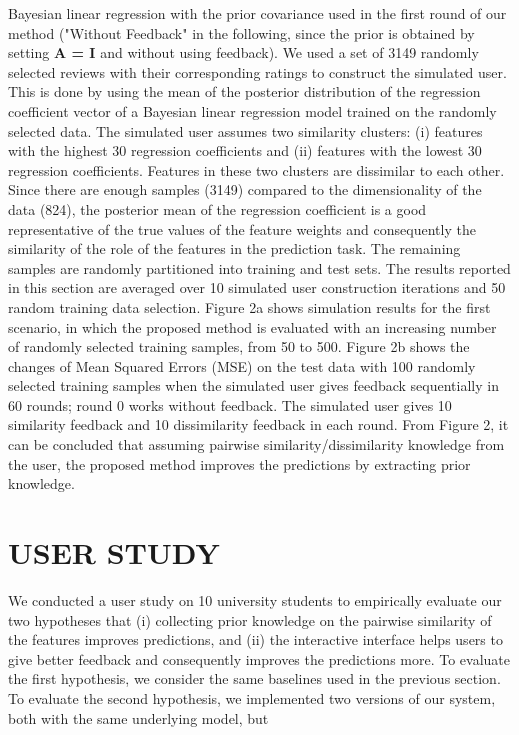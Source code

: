 \documentclass{sig-alternate}
\begin{document}
Bayesian linear regression with the prior covariance used in the
first round of our method ("Without Feedback" in the following,
since the prior is obtained by setting \textbf{A = I} and without using feedback).
We used a set of 3149 randomly selected reviews with their
corresponding ratings to construct the simulated user. This is done
by using the mean of the posterior distribution of the regression
coefficient vector of a Bayesian linear regression model trained
on the randomly selected data. The simulated user assumes two
similarity clusters: (i) features with the highest 30 regression coefficients
and (ii) features with the lowest 30 regression coefficients.
Features in these two clusters are dissimilar to each other. Since
there are enough samples (3149) compared to the dimensionality
of the data (824), the posterior mean of the regression coefficient
is a good representative of the true values of the feature weights
and consequently the similarity of the role of the features in the
prediction task.
The remaining samples are randomly partitioned into training
and test sets. The results reported in this section are averaged over
10 simulated user construction iterations and 50 random training
data selection. Figure 2a shows simulation results for the first scenario,
in which the proposed method is evaluated with an increasing
number of randomly selected training samples, from 50 to 500. Figure
2b shows the changes of Mean Squared Errors (MSE) on the
test data with 100 randomly selected training samples when the
simulated user gives feedback sequentially in 60 rounds; round 0
works without feedback. The simulated user gives 10 similarity
feedback and 10 dissimilarity feedback in each round.
From Figure 2, it can be concluded that assuming pairwise similarity/dissimilarity
knowledge from the user, the proposed method
improves the predictions by extracting prior knowledge.

\section{USER STUDY}

We conducted a user study on 10 university students to empirically
evaluate our two hypotheses that (i) collecting prior knowledge on
the pairwise similarity of the features improves predictions, and
(ii) the interactive interface helps users to give better feedback and
consequently improves the predictions more. To evaluate the first
hypothesis, we consider the same baselines used in the previous
section. To evaluate the second hypothesis, we implemented two
versions of our system, both with the same underlying model, but
\end{document}
